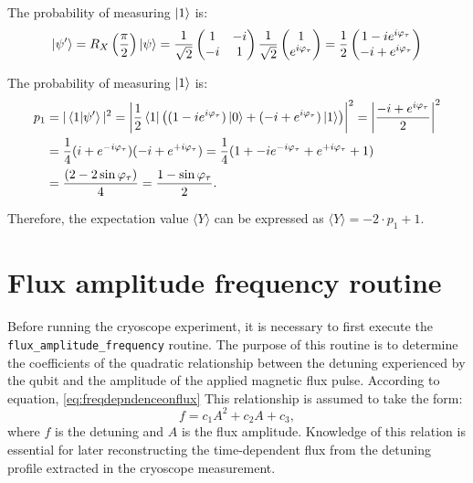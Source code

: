 The probability of measuring $\ket{1}$ is:
\begin{equation}
    \ket{\psi'} = R_X\left(\frac{\pi}{2}\right) \ket{\psi} = \frac{1}{\sqrt{2}} 
\begin{pmatrix}
1 & -i \\
-i & 1
\end{pmatrix}
\frac{1}{\sqrt{2}} 
\begin{pmatrix}
1\\
e^{i\varphi_\tau}
\end{pmatrix}
= \frac{1}{2}
\begin{pmatrix}
1 - ie^{i\varphi_\tau} \\
-i + e^{i\varphi_\tau}
\end{pmatrix}
\end{equation}

The probability of measuring $\ket{1}$ is:
\begin{align}\label{eq:P1Y}
    p_1 &= |\braket{1 | \psi'}|^2 = \left| \frac{1}{2} \bra{1} \left( (1 - ie^{i\varphi_\tau})\ket{0} + (-i + e^{i\varphi_\tau})\ket{1} \right) \right|^2 = \left| \frac{-i + e^{i\varphi_\tau}}{2} \right|^2\\
        &= \frac{1}{4} (i+e^{-i\varphi_\tau})(-i+e^{+i\varphi_\tau}) = \frac{1}{4}(1 + -ie^{-i\varphi_\tau} + e^{+i\varphi_\tau} +1)\\ 
        &=\frac{(2- 2\sin{\varphi_\tau})}{4} = \frac{1 -\sin{\varphi_\tau}}{2}.
\end{align}

Therefore, the expectation value $\langle Y \rangle$ can be expressed as $\langle Y \rangle =- 2\cdot p_1 + 1$.

\chapter{Flux amplitude frequency routine}
\label{app:flux_amplitude_frequency}

Before running the cryoscope experiment, it is necessary to first execute the \texttt{flux\_amplitude\_frequency} routine. 
The purpose of this routine is to determine the coefficients of the quadratic relationship between the detuning experienced by the qubit and the amplitude of the applied magnetic flux pulse. 
According to equation, \ref{eq:freqdepndenceonflux} This relationship is assumed to take the form:
\begin{equation}
f = c_1 A^2 + c_2 A + c_3,
\label{eq:freqdepndenceonflux}
\end{equation}
where $f$ is the detuning and $A$ is the flux amplitude. 
Knowledge of this relation is essential for later reconstructing the time-dependent flux from the detuning profile extracted in the cryoscope measurement.

